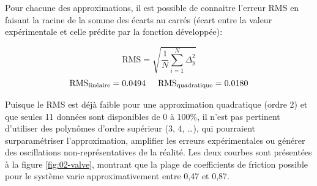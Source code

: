Pour chacune des approximations, il est possible de connaitre l'erreur RMS en
faisant la racine de la somme des écarts au carrés (écart entre la valeur
expérimentale et celle prédite par la fonction développée):

\begin{equation}
	\textrm{RMS} = \sqrt{\frac{1}{N}\sum_{i=1}^{N}\Delta_y^2}
\end{equation}
\begin{equation}
	\textrm{RMS}_\textrm{linéaire} = 0.0494\hspace{.5cm}
	\textrm{RMS}_\textrm{quadratique} = 0.0180
\end{equation}

Puisque le RMS est déjà faible pour une approximation quadratique (ordre 2) et
que seules 11 données sont disponibles de 0 à 100\%, il n’est pas pertinent
d’utiliser des polynômes d’ordre supérieur (3, 4, \ldots), qui pourraient
surparamétriser l’approximation, amplifier les erreurs expérimentales ou générer
des oscillations non-représentatives de la réalité. Les deux courbes sont
présentées à la figure \ref{fig:02-valve}, montrant que la plage de coefficients
de friction possible pour le système varie approximativement entre 0,47 et 0,87.

